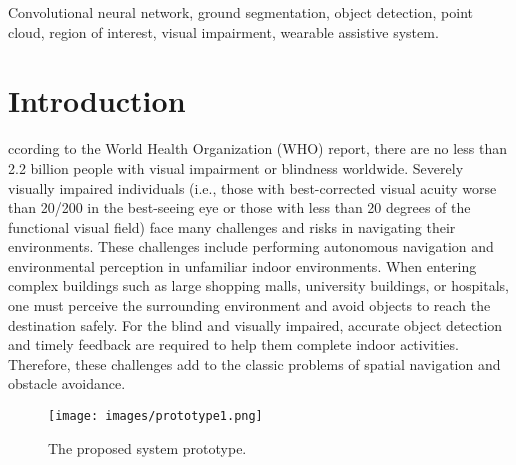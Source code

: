 \documentclass{ieeeaccess}
\begin{document}
\begin{keywords}
Convolutional neural network, ground segmentation, object detection, point cloud, region of interest, visual impairment, wearable assistive system.
\end{keywords}

\titlepgskip=-15pt

\maketitle

\section{Introduction}
\label{sec:introduction}
ccording to the World Health Organization (WHO) report\cite{WHO}, there are no less than 2.2 billion people with visual impairment or blindness worldwide. Severely visually impaired individuals (i.e., those with best-corrected visual acuity worse than 20/200 in the best-seeing eye or those with less than 20 degrees of the functional visual field) face many challenges and risks in navigating their environments. These challenges include performing autonomous navigation and environmental perception in unfamiliar indoor environments. When entering complex buildings such as large shopping malls, university buildings, or hospitals, one must perceive the surrounding environment and avoid objects to reach the destination safely. For the blind and visually impaired, accurate object detection and timely feedback are required to help them complete indoor activities. Therefore, these challenges add to the classic problems of spatial navigation and obstacle avoidance.

\begin{figure}[t]
    \centering
    \texttt{[image: images/prototype1.png]}
    \caption{The proposed system prototype.}
    \label{fig:prototype}%
\end{figure}
\end{document}
